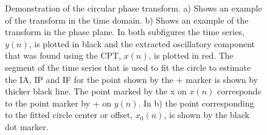 \documentclass[a4paper]{IEEEtran}
\begin{document}

\begin{figure}[ht]
	\centering
	\caption{Demonstration of the circular phase transform. a) Shows an example of the transform in the time domain. b) Shows an example of the transform in the phase plane. In both subfigures the time series, $y(n)$, is plotted in black and the extracted oscillatory component that was found using the CPT, $x(n)$, is plotted in red. The segment of the time series that is used to fit the circle to estimate the IA, IP and IF for the point shown by the + marker is shown by thicker black line. The point marked by the x on $x(n)$ corresponds to the point marker by + on $y(n)$. In b) the point corresponding to the fitted circle center or offset, $x_0(n)$, is shown by the black dot marker.}\label{fig:MappingDemo}
\end{figure}
\end{document}
